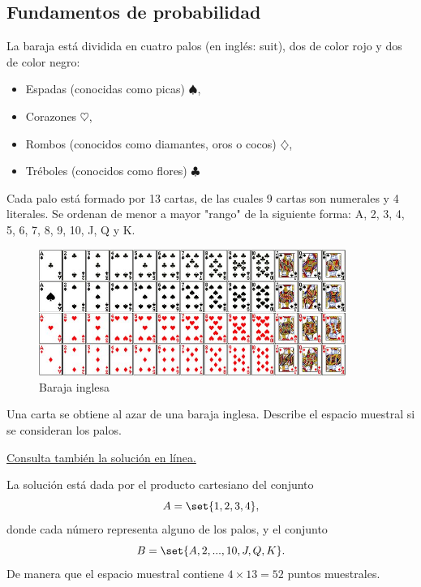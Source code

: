 
\subsection{Fundamentos de probabilidad}

La baraja está dividida en cuatro palos (en inglés: suit), dos de color rojo y dos de color negro:
\begin{itemize}
	\item Espadas (conocidas como picas) $\spadesuit$,
	\item Corazones $\heartsuit$,
	\item Rombos (conocidos como diamantes, oros o cocos) $ \diamondsuit$,
	\item Tréboles (conocidos como flores) $\clubsuit$
\end{itemize}

Cada palo está formado por 13 cartas, de las cuales 9 cartas son numerales y 4 literales. Se ordenan de menor a mayor "rango" de la siguiente forma: A, 2, 3, 4, 5, 6, 7, 8, 9, 10, J, Q y K.

\begin{figure}
	\centering
	\includegraphics[width=10cm]{./pe/deck.jpg}
	\caption{Baraja inglesa}
	\label{fig:deck}
\end{figure}



\begin{problema}
	\label{solved:1.1}
	Una carta se obtiene al azar de una baraja inglesa. Describe el espacio muestral si se consideran los palos.
\end{problema}

\begin{solucion}\href{https://youtu.be/4LdLWpQIcBQ}{Consulta también la solución en línea.}
	
	
	La solución está dada por el producto cartesiano del conjunto \[ A = \set{1,2,3,4}, \] donde cada número representa alguno de los palos, y el conjunto \[ B = \set{A,2,...,10,J,Q,K}.\] De manera que el espacio muestral contiene $ 4\times 13=52 $ puntos muestrales. 	
\end{solucion}


